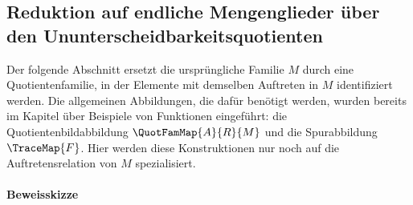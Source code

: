 \documentclass[main.tex]{subfiles}
\begin{document}
\subsection{Reduktion auf endliche Mengenglieder über den
Ununterscheidbarkeitsquotienten}

Der folgende Abschnitt ersetzt die ursprüngliche Familie \(M\) durch eine
Quotientenfamilie, in der Elemente mit demselben Auftreten in \(M\)
identifiziert werden. Die allgemeinen Abbildungen, die dafür benötigt werden,
wurden bereits im Kapitel über Beispiele von Funktionen eingeführt:
die Quotientenbildabbildung \(\QuotFamMap{A}{R}{M}\) und die
Spurabbildung \(\TraceMap{F}\). Hier werden diese Konstruktionen nur noch auf
die Auftretensrelation von \(M\) spezialisiert.

\paragraph{Beweisskizze}
\end{document}
